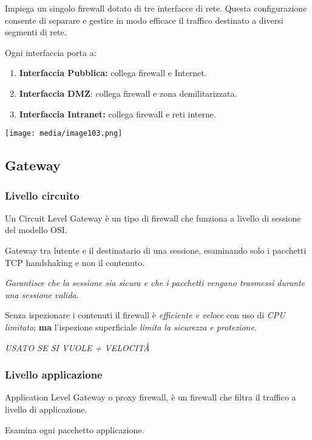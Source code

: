 Impiega un singolo firewall dotato di tre interfacce di rete. Questa
configurazione consente di separare e gestire in modo efficace il
traffico destinato a diversi segmenti di rete.

Ogni interfaccia porta a:

\begin{enumerate}
\def\labelenumi{\arabic{enumi}.}
\item
  \textbf{Interfaccia Pubblica:} collega firewall e Internet.
\item
  \textbf{Interfaccia DMZ}: collega firewall e zona demilitarizzata.
\item
  \textbf{Interfaccia Intranet:} collega firewall e reti interne.
\end{enumerate}

\texttt{[image: media/image103.png]}

\subsection{Gateway}\label{gateway}

\subsubsection{Livello circuito}\label{livello-circuito}

Un Circuit Level Gateway è un tipo di firewall che funziona a livello di
sessione del modello OSI.

Gateway tra l\textquotesingle utente e il destinatario di una sessione,
esaminando solo i pacchetti TCP handshaking e non il contenuto.

\emph{Garantisce che la sessione sia sicura e che i pacchetti vengano
trasmessi durante una sessione valida.}

Senza ispezionare i contenuti il firewall è \emph{efficiente e veloce}
con uso di \emph{CPU limitato}; \textbf{ma} l'ispezione superficiale
\emph{limita la sicurezza e protezione}.

\emph{USATO SE SI VUOLE + VELOCITÀ}

\subsubsection{Livello applicazione}\label{livello-applicazione}

Application Level Gateway o proxy firewall, è un firewall che filtra il
traffico a livello di applicazione.

Esamina ogni pacchetto applicazione.

